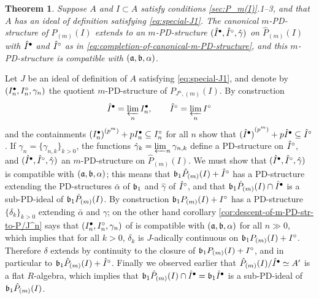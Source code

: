 \documentclass{article}
\theoremstyle{change}
\newtheorem{thm}[subsubsection]{Theorem}
\numberwithin{equation}{subsubsection}
\newcommand{\demobox}{\vrule height6pt width6pt depth0pt}
\newenvironment{demo}{\noindent{\it Proof.}}
{{\unskip\nobreak\hfil\qquad
\demobox\parfillskip=0pt\par}
\medskip}
\begin{document}
\begin{thm}\label{thm:descent-of-m-PD-str-to-Phat}
  Suppose $A$ and $I\subset A$ satisfy conditions
  \ref{sec:P_m(I)}.1--3, and that $A$ has an ideal of definition
  satisfying \ref{eq:special-J1}. The canonical $m$-PD-structure of
  $P_{(m)}(I)$ extends to an $m$-PD-structure
  $(\hat I^\bullet,\hat I^\circ,\hat\gamma)$ on $\hat P_{(m)}(I)$ with
  $\hat I^\bullet$ and $\hat I^\circ$ as in
  \ref{eq:completion-of-canonical-m-PD-structure}, and this
  $m$-PD-structure is compatible with $({\mathfrak a},{\mathfrak b},\alpha)$.
\end{thm}
\begin{demo}
  Let $J$ be an ideal of definition of $A$ satisfying
  \ref{eq:special-J1}, and denote by $(I^\bullet_n,I^\circ_n,\gamma_n)$
  the quotient $m$-PD-structure of $P_{J^n,(m)}(I)$. By construction
  \begin{displaymath}
    \hat I^\bullet=\varprojlim_n I^\bullet_n,\qquad \hat I^\circ=\varprojlim_n I^\circ
  \end{displaymath}
  and the containments
  ${(I_n^\bullet)}^{({p^m})}+p I_n^\bullet\subseteq I_n^\circ$ for all $n$ show
  that ${(\hat I^\bullet)}^{({p^m})}+p\hat I^\bullet\subseteq\hat I^\circ$.  If
  $\gamma_n=\{\gamma_{n,k}\}_{k>0}$, the functions
  $\hat\gamma_k=\varprojlim_n\gamma_{n,k}$ define a PD-structure on
  $\hat I^\circ$, and $(\hat I^\bullet,\hat I^\circ,\hat\gamma)$ an
  $m$-PD-structure on $\hat P_{(m)}(I)$. We must show that
  $(\hat I^\bullet,\hat I^\circ,\hat\gamma)$ is compatible with
  $({\mathfrak a},{\mathfrak b},\alpha)$; this means that
  ${\mathfrak b}_1\hat P_{(m)}(I)+\hat I^\circ$ has a PD-structure extending the
  PD-structures $\bar\alpha$ of ${\mathfrak b}_1$ and $\hat\gamma$ of
  $\hat I^\circ$, and that ${\mathfrak b}_1\hat P_{(m)}(I)\cap\hat I^\bullet$ is a
  sub-PD-ideal of ${\mathfrak b}_1\hat P_{(m)}(I)$. By construction
  ${\mathfrak b}_1P_{(m)}(I)+I^\circ$ has a PD-structure $\{\delta_k\}_{k>0}$
  extending $\bar\alpha$ and $\gamma$; on the other hand corollary
  \ref{cor:descent-of-m-PD-str-to-P/J^n} says that
  $(I^\bullet_n,I^\circ_n,\gamma_n)$ of is compatible with
  $({\mathfrak a},{\mathfrak b},\alpha)$ for all $n\gg0$, which implies that for all
  $k>0$, $\delta_k$ is $J$-adically continuous on
  ${\mathfrak b}_1P_{(m)}(I)+I^\circ$. Therefore $\delta$ extends by continuity
  to the closure of ${\mathfrak b}_1P_{(m)}(I)+I^\circ$, and in particular to
  ${\mathfrak b}_1\hat P_{(m)}(I)+\hat I^\circ$. Finally we observed earlier
  that $\hat P_{(m)}(I)/\hat I^\bullet\simeq A'$ is a flat $R$-algebra,
  which implies that
  ${\mathfrak b}_1\hat P_{(m)}(I)\cap\hat I^\bullet={\mathfrak b}_1\hat I^\bullet$ is a
  sub-PD-ideal of ${\mathfrak b}_1\hat P_{(m)}(I)$.
\end{demo}
\end{document}
